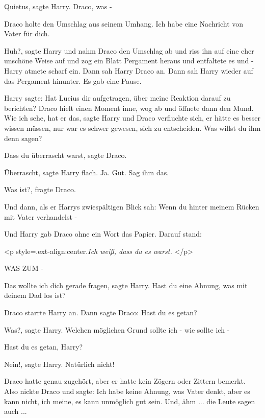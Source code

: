 \glqq{}Quietus\grqq{}, sagte Harry. \glqq{}Draco, was -\grqq{}

Draco holte den Umschlag aus seinem Umhang. \glqq{}Ich habe eine Nachricht von
Vater für dich.\grqq{}

\glqq{}Huh?\grqq{}, sagte Harry und nahm Draco den Umschlag ab und riss ihn auf
eine eher unschöne Weise auf und zog ein Blatt Pergament heraus und entfaltete
es und - Harry atmete scharf ein. Dann sah Harry Draco an. Dann sah Harry wieder
auf das Pergament hinunter. Es gab eine Pause.

Harry sagte: \glqq{}Hat Lucius dir aufgetragen, über meine Reaktion darauf zu
berichten?\grqq{} Draco hielt einen Moment inne, wog ab und öffnete dann den
Mund. \glqq{}Wie ich sehe, hat er das\grqq{}, sagte Harry und Draco verfluchte
sich, er hätte es besser wissen müssen, nur war es schwer gewesen, sich zu
entscheiden. \glqq{}Was willst du ihm denn sagen?\grqq{}

\glqq{}Dass du überrascht warst\grqq{}, sagte Draco.

\glqq{}Überrascht\grqq{}, sagte Harry flach. \glqq{}Ja. Gut. Sag ihm das.\grqq{}

\glqq{}Was ist?\grqq{}, fragte Draco.

Und dann, als er Harrys zwiespältigen Blick sah: \glqq{}Wenn du hinter meinem
Rücken mit Vater verhandelst -\grqq{}

Und Harry gab Draco ohne ein Wort das Papier. Darauf stand:

<p style=\grqq{}.ext-align:center\grqq{}.\emph{Ich weiß, dass du es warst.} </p>

\glqq{}WAS ZUM -\grqq{}

\glqq{}Das wollte ich dich gerade fragen\grqq{}, sagte Harry. \glqq{}Hast du eine
Ahnung, was mit deinem Dad los ist?\grqq{}

Draco starrte Harry an. Dann sagte Draco: \glqq{}Hast du es getan?\grqq{}

\glqq{}Was?\grqq{}, sagte Harry. \glqq{}Welchen möglichen Grund sollte ich - wie
sollte ich -\grqq{}

\glqq{}Hast du es getan, Harry?\grqq{}

\glqq{}Nein!\grqq{}, sagte Harry. \glqq{}Natürlich nicht!\grqq{}

Draco hatte genau zugehört, aber er hatte kein Zögern oder Zittern bemerkt. Also
nickte Draco und sagte: \glqq{}Ich habe keine Ahnung, was Vater denkt, aber es
kann nicht, ich meine, es kann unmöglich gut sein. Und, ähm ... die Leute sagen
auch ...\grqq{}

